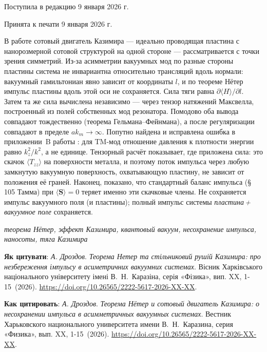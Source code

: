 \documentclass[twoside, 10pt]{article}
\def\myfirstpage{1}
\def\mylastpage{15}
\def\mypages{\myfirstpage-\mylastpage}
\def\myname{А. Дроздов}
\def\mynameukr{А. Дроздов}
\def\mytitle{Теорема Нётер и сотовый двигатель Казимира: о несохранении импульса в асимметричных вакуумных системах}
\def\mytitleukr{Теорема Нетер та стільниковий рушій Казимира: про незбереження імпульсу в асиметричних вакуумних системах}
\def\mydoi{10.26565/2222-5617-2026-XX-XX} %
\def\ukrvisnyk{Вісник Харківського національного університету імені В.~Н.~Каразіна, серія «Фізика», вип. XX, \mypages~(2026)}
\def\ruvisnyk{Вестник Харьковского национального университета имени В.~Н.~Каразина, серия «Физика», вып. XX, \mypages~(2026)}
\def\myreceived{Поступила в редакцию 9 января 2026 г.}
\def\myaccepted{Принята к печати 9 января 2026 г.}
\begin{document}
\vspace{5mm}
\centerline{\myreceived}
\centerline{\myaccepted}

\vspace{5mm}

В работе сотовый двигатель Казимира \cite{Drozdov2024} --- идеально проводящая пластина
с нанорозмерной сотовой структурой на одной стороне --- рассматривается с точки зрения симметрий.
Из-за асимметрии вакуумных мод по разные стороны пластины система не инвариантна относительно
трансляций вдоль нормали: вакуумный гамильтониан явно зависит от координаты \(l\), и по теореме
Нётер импульс пластины вдоль этой оси не сохраняется. Сила тяги равна \(\partial\langle H\rangle/\partial l\).
Затем та же сила вычислена независимо --- через тензор натяжений Максвелла, построенный из полей
собственных мод резонатора. Помодово оба вывода совпадают тождественно (теорема Гельмана--Фейнмана),
а после регуляризации совпадают в пределе \(ak_m\to\infty\). Попутно найдена и исправлена ошибка
в приложении~B работы \cite{Drozdov2024}: для TM-мод отношение давления к плотности энергии равно
\(k_z^2/k^2\), а не единице. Тензорный расчёт показывает, где приложена сила: это скачок
\(\langle T_{zz}\rangle\) на поверхности металла, и поэтому поток импульса через любую замкнутую
вакуумную поверхность, охватывающую пластину, не зависит от положения её граней. Наконец, показано,
что стандартный баланс импульса (\S\,105 Тамма) при \(\langle\mathbf S\rangle=0\) теряет именно
эти скачковые члены. Не сохраняется импульс вакуумного поля (и пластины); полный импульс системы
\emph{пластина\,+\,вакуумное поле} сохраняется.

\vspace{5mm}

\noindent
\begin{keywords}
\textit{теорема Нётер, эффект Казимира, квантовый вакуум, несохранение импульса, наносоты, тяга Казимира}
\end{keywords}

\vspace{5mm}

\noindent
\textbf{Як цитувати}: \textit{\mynameukr}. \textit{\mytitleukr}. {\ukrvisnyk}. \href{https://doi.org/\mydoi} {https://doi.org/\mydoi}.

\vspace{5mm}

\noindent
\textbf{Как цитировать}: \textit{\myname}. \textit{\mytitle}. {\ruvisnyk}. \href{https://doi.org/\mydoi} {https://doi.org/\mydoi}.
\end{document}
